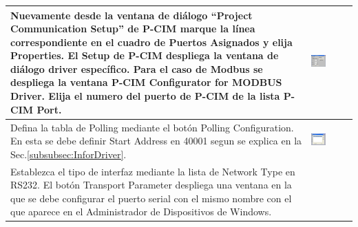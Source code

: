 \begin{table}[!ht]
\centering
\renewcommand*{\arraystretch}{0.01}
\begin{tabular}{*{2}{m{}}}
\hline
  Nuevamente desde la ventana de diálogo ``Project Communication Setup'' de
  P-CIM marque la línea correspondiente en el cuadro de Puertos Asignados y 
  elija  Properties. El Setup de P-CIM despliega la ventana de diálogo driver 
  específico. Para el caso de Modbus se despliega la ventana P-CIM Configurator 
  for MODBUS Driver. Elija el numero del puerto de P-CIM de la lista P-CIM Port.
  &\begin{center}
    \includegraphics[width=0.4\textwidth]
      {Cap5-SCADA/images/modbusDriver.jpeg}
  \end{center}\\
\hline
  Defina la tabla de Polling mediante el botón Polling Configuration. En esta 
  se debe definir Start Address en 40001 segun se explica en la 
  Sec.\ref{subsubsec:InforDriver}.
  &\begin{center}
        \includegraphics[width=0.4\textwidth]
      {Cap5-SCADA/images/modbusDriver1.jpeg}
  \end{center}\\
\hline 
   Establezca el tipo de interfaz mediante la lista de Network Type en RS232. 
   El botón Transport Parameter despliega una ventana en la que se debe 
   configurar el puerto serial con  el 
   mismo nombre con el que aparece en el Administrador de Dispositivos de 
   Windows.
  &\begin{center}

\end{center}
\end{tabular}
\end{table}
